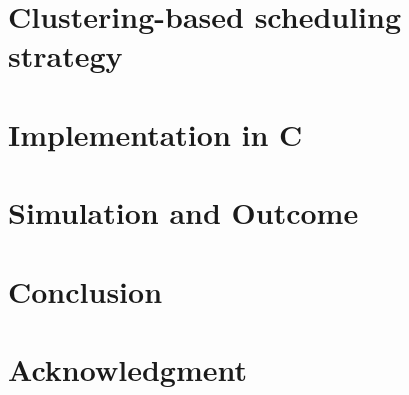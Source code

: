\documentclass[conference]{IEEEtran}
\begin{document}



\section{Clustering-based scheduling strategy}
\label{sec: clustering-based scheduling}

\section{Implementation in C}
\label{sec:implementation}

\section{Simulation and Outcome}
\label{sec: simulation and outcome}



\section{Conclusion}
\label{sec: conclusion}


\section*{Acknowledgment}
\end{document}
